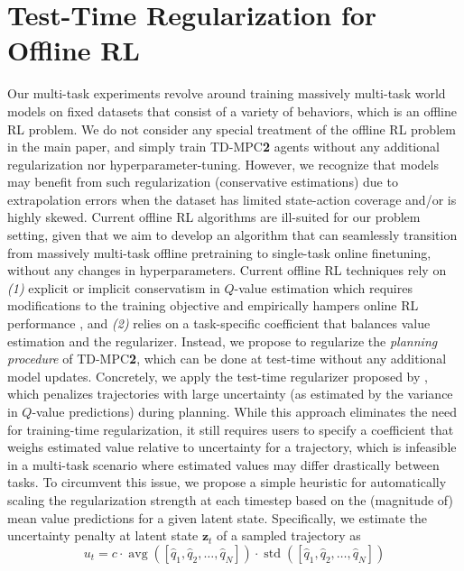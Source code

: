 \documentclass{article}
\begin{document}
\clearpage
\newpage

\section{Test-Time Regularization for Offline RL}
\label{sec:appendix-test-time-regularization}
Our multi-task experiments revolve around training massively multi-task world models on fixed datasets that consist of a variety of behaviors, which is an offline RL problem. We do not consider any special treatment of the offline RL problem in the main paper, and simply train TD-MPC\textbf{2} agents without any additional regularization nor hyperparameter-tuning. However, we recognize that models may benefit from such regularization (conservative estimations) due to extrapolation errors when the dataset has limited state-action coverage and/or is highly skewed. Current offline RL algorithms are ill-suited for our problem setting, given that we aim to develop an algorithm that can seamlessly transition from massively multi-task offline pretraining to single-task online finetuning, without any changes in hyperparameters. Current offline RL techniques rely on \emph{(1)} explicit or implicit conservatism in $Q$-value estimation which requires modifications to the training objective and empirically hampers online RL performance \citep{nakamoto2023calql}, and \emph{(2)} relies on a task-specific coefficient that balances value estimation and the regularizer. Instead, we propose to regularize the \emph{planning procedure} of TD-MPC\textbf{2}, which can be done at test-time without any additional model updates. Concretely, we apply the test-time regularizer proposed by \citet{Feng2023Finetuning}, which penalizes trajectories with large uncertainty (as estimated by the variance in $Q$-value predictions) during planning. While this approach eliminates the need for training-time regularization, it still requires users to specify a coefficient that weighs estimated value relative to uncertainty for a trajectory, which is infeasible in a multi-task scenario where estimated values may differ drastically between tasks. To circumvent this issue, we propose a simple heuristic for automatically scaling the regularization strength at each timestep based on the (magnitude of) mean value predictions for a given latent state. Specifically, we estimate the uncertainty penalty at latent state $\mathbf{z}_{t}$ of a sampled trajectory as
\begin{equation}
    \label{eq:appendix-uncertainty}
    u_{t} = c \cdot \operatorname{avg}([\hat{q}_{1}, \hat{q}_{2}, \dots, \hat{q}_{N}]) \cdot \operatorname{std}([\hat{q}_{1}, \hat{q}_{2}, \dots, \hat{q}_{N}])
\end{equation}
\end{document}
